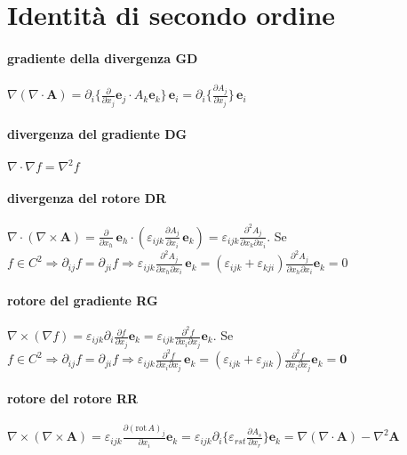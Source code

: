 \documentclass[10pt,a4paper]{article}
\newcommand{\fracp}[2]{\frac{\partial #1}{\partial #2}}
\newcommand{\fracpp}[3]{\frac{\partial^2 #1}{\partial #2 \partial #3}}
\newcommand{\rot}[1]{\text{rot}\,#1}
\begin{document}
	\section{Identità di secondo ordine}
\paragraph{gradiente della divergenza GD} $\nabla(\nabla \cdot \mathbf A) = \partial_i \{\fracp{}{x_j} \mathbf e_j \cdot A_k \mathbf e_k\}\, \mathbf e_i = \partial_i \{\fracp{A_j}{x_j}\}\, \mathbf e_i$

\paragraph{divergenza del gradiente DG} $\nabla \cdot \nabla f = \nabla^2 f$

\paragraph{divergenza del rotore DR} $\nabla \cdot(\nabla \times \mathbf A) = \fracp{}{x_h}\, \mathbf e_h \cdot (\varepsilon_{ijk} \fracp{A_j}{x_i}\, \mathbf e_k) = \varepsilon_{ijk} \fracpp{A_j}{x_k}{x_i}$.\;\; Se $f \in C^2 \Rightarrow \partial_{ij}f = \partial_{ji}f \Rightarrow \varepsilon_{ijk} \fracpp{A_j}{x_h}{x_i}\, \mathbf e_k = (\varepsilon_{ijk}+\varepsilon_{kji}) \fracpp{A_j}{x_h}{x_i} \mathbf e_k = 0$

\paragraph{rotore del gradiente RG} $\nabla \times {(\nabla f)} = \varepsilon_{ijk} \partial_i \fracp{f}{x_j} \mathbf e_k = \varepsilon_{ijk} \frac{\partial^2 f}{\partial x_i\partial x_j} \mathbf e_k$.\;\; Se $f \in C^2 \Rightarrow \partial_{ij}f = \partial_{ji}f \Rightarrow \varepsilon_{ijk}\fracpp{f}{x_i}{x_j}\, \mathbf e_k = (\varepsilon_{ijk} + \varepsilon_{jik}) \fracpp{f}{x_i}{x_j} \mathbf e_k = \mathbf 0$

\paragraph{rotore del rotore RR} $\nabla \times (\nabla \times \mathbf A) = \varepsilon_{ijk} \fracp{(\rot A)_j}{x_i} \mathbf e_k = \varepsilon_{ijk} \partial_i \{\varepsilon_{rst} \fracp{A_s}{x_r}\} \mathbf e_k =
\nabla (\nabla\cdot\mathbf A) - \nabla^2\mathbf A$
\end{document}
